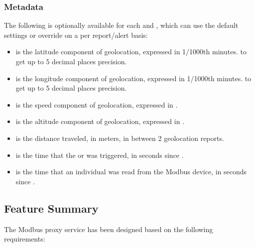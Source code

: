 \documentclass[letterpaper,10pt,english]{sphinxmanual}
\begin{document}
\subsubsection{Metadata}
\label{\detokenize{funcspec:metadata}}
The following  is optionally available for each  and , which can use the default settings or override on a per report/alert basis:
\begin{itemize}
\item {} 
 is the latitude component of geolocation, expressed in 1/1000th minutes.   to get  up to 5 decimal places precision.

\item {} 
 is the longitude component of geolocation, expressed in 1/1000th minutes.   to get  up to 5 decimal places precision.

\item {} 
 is the speed component of geolocation, expressed in .

\item {} 
 is the altitude component of geolocation, expressed in .

\item {} 
 is the distance traveled, in meters, in between 2 geolocation reports.

\item {} 
 is the time that the  or  was triggered, in seconds since .

\item {} 
 is the time that an individual  was read from the Modbus device, in seconds since .

\end{itemize}


\subsection{Feature Summary}
\label{\detokenize{funcspec:feature-summary}}
The Modbus proxy service has been designed based on the following requirements:
\end{document}
